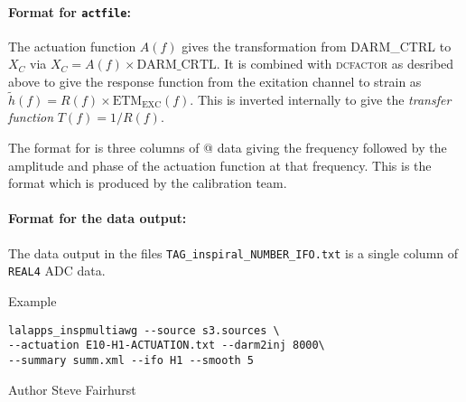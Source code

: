 \begin{entry}
\paragraph{Format for \texttt{actfile}:} The actuation function $A(f)$
gives the transformation from DARM\_CTRL to $X_{C}$ via $X_{C} = A(f) 
\times \mathrm{DARM}\_\mathrm{CRTL}$.   It is combined with
\textsc{dcfactor} as desribed above to give the response function from
the exitation channel to strain as
$\tilde{h}(f)=R(f) \times \mathrm{ETM}_\mathrm{EXC}(f)$.  This is inverted internally 
to give the \emph{transfer function} $T(f)=1/R(f)$. 

The format for \verb@actfile@ is three columns of @ data giving the 
frequency followed by the amplitude and phase of the actuation function
at that frequency.  This is the format which is produced by the
calibration team.

\paragraph{Format for the data output:} The data output in the files
\verb$TAG_inspiral_NUMBER_IFO.txt$ is a single column of \verb$REAL4$ ADC data.

\item[Example]
\begin{verbatim}
lalapps_inspmultiawg --source s3.sources \
--actuation E10-H1-ACTUATION.txt --darm2inj 8000\ 
--summary summ.xml --ifo H1 --smooth 5
\end{verbatim}

\item[Author] 
Steve Fairhurst
\end{entry}
\clearpage
